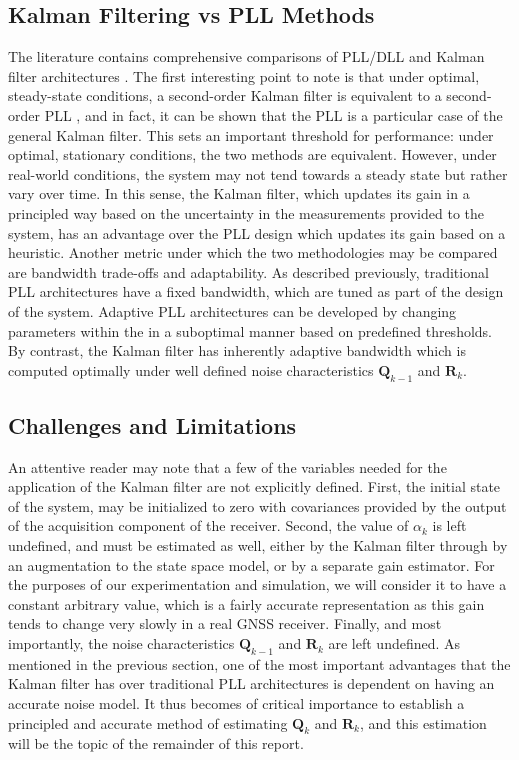 \documentclass[11pt]{article}
\begin{document}
\subsection{Kalman Filtering vs PLL Methods}

The literature contains comprehensive comparisons of PLL/DLL and Kalman filter architectures \cite{vila2017plls}. The first interesting point to note is that under optimal, steady-state conditions, a second-order Kalman filter is equivalent to a second-order PLL \cite{Pata-99}, and in fact, it can be shown that the PLL is a particular case of the general Kalman filter. This sets an important threshold for performance: under optimal, stationary conditions, the two methods are equivalent. However, under real-world conditions, the system may not tend towards a steady state but rather vary over time. In this sense, the Kalman filter, which updates its gain in a principled way based on the uncertainty in the measurements provided to the system, has an advantage over the PLL design which updates its gain based on a heuristic. Another metric under which the two methodologies may be compared are bandwidth trade-offs and adaptability. As described previously, traditional PLL architectures have a fixed bandwidth, which are tuned as part of the design of the system. Adaptive PLL architectures can be developed by changing parameters within the in a suboptimal manner based on predefined thresholds. By contrast, the Kalman filter has inherently adaptive bandwidth which is computed optimally under well defined noise characteristics $\mathbf{Q}_{k-1}$ and $\mathbf{R}_k$.

\subsection{Challenges and Limitations}

An attentive reader may note that a few of the variables needed for the application of the Kalman filter are not explicitly defined. First, the initial state of the system, may be initialized to zero with covariances provided by the output of the acquisition component of the receiver. Second, the value of $\alpha_k$ is left undefined, and must be estimated as well, either by the Kalman filter through by an augmentation to the state space model, or by a separate gain estimator. For the purposes of our experimentation and simulation, we will consider it to have a constant arbitrary value, which is a fairly accurate representation as this gain tends to change very slowly in a real GNSS receiver. Finally, and most importantly, the noise characteristics $\mathbf{Q}_{k-1}$ and $\mathbf{R}_k$ are left undefined. As mentioned in the previous section, one of the most important advantages that the Kalman filter has over traditional PLL architectures is dependent on having an accurate noise model. It thus becomes of critical importance to establish a principled and accurate method of estimating $\mathbf{Q}_k$ and $\mathbf{R}_k$, and this estimation will be the topic of the remainder of this report.
\end{document}
